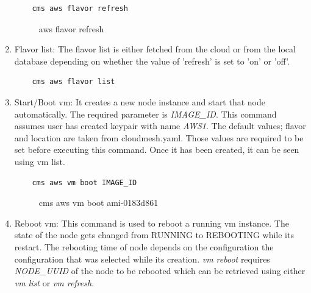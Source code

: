 \documentclass[9pt,twocolumn,twoside]{../../styles/osajnl}
\begin{document}
\begin{enumerate}
	\begin{verbatim}
    cms aws flavor refresh
	\end{verbatim}
		
	\begin{figure}[h!]
		\centering
		\caption{aws flavor refresh }
		\label{fig:flavorlist}
	\end{figure}
	
	\item Flavor list: The flavor list is either fetched from the cloud or from the local database depending on whether the value of 'refresh' is set to 'on' or 'off'.
	
	\begin{verbatim}
    cms aws flavor list
	\end{verbatim}
	
    \item Start/Boot vm: It creates a new node instance and start that node automatically. The required parameter is \textit{IMAGE\_ID}. This command assumes user has created keypair with name \textit{AWS1}. The default values; flavor and location are taken from cloudmesh.yaml. Those values are required to be set before executing this command. Once it has been created, it can be seen using vm list.
    
    \begin{verbatim}
    cms aws vm boot IMAGE_ID
    \end{verbatim}
    
   	\begin{figure}[h!]
	   	\centering
	   	\caption{cms aws vm boot ami-0183d861 }
	   	\label{fig:vmboot}
    \end{figure}

    \item Reboot vm: This command is used to reboot a running vm instance. The state of the node gets changed from RUNNING to REBOOTING while its restart. The rebooting time of node depends on the configuration the configuration that was selected while its creation. \textit{vm reboot} requires \textit{NODE\_UUID} of the node to be rebooted which can be retrieved using either \textit{vm list} or \textit{vm refresh}.
    

\end{enumerate}
\end{document}
